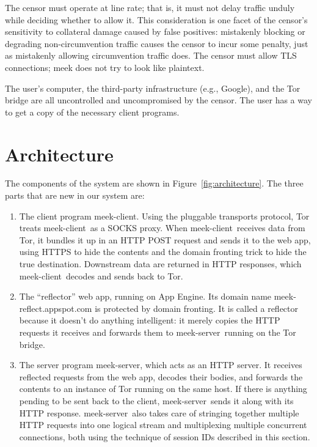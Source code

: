 \documentclass[conference]{IEEEtran}
\def\meekclient{\mbox{meek-client}}
\def\meekserver{\mbox{meek-server}}
\begin{document}
The censor must operate at line rate; that is,
it must not delay traffic unduly while deciding whether to allow it.
This consideration is one facet of the censor's sensitivity to
collateral damage caused by false positives:
mistakenly blocking or degrading non-circumvention traffic causes the censor
to incur some penalty, just as mistakenly allowing circumvention traffic does.
The censor must allow TLS connections; meek does not try to look like plaintext.

The user's computer, the third-party infrastructure (e.g., Google), and the Tor bridge
are all uncontrolled and uncompromised by the censor.
The user has a way to get a copy of the necessary client programs.

\section{Architecture}

The components of the system are shown in Figure~\ref{fig:architecture}.
The three parts that are new in our system are:
\begin{enumerate}
\item The client program \meekclient.
Using the pluggable transports protocol, Tor treats \meekclient\ as a SOCKS proxy.
When \meekclient\ receives data from Tor, it bundles it up in an HTTP POST
request and sends it to the web app,
using HTTPS to hide the contents and the domain fronting trick to hide the true destination.
Downstream data are returned in HTTP responses, which \meekclient\ decodes and sends back to Tor.
\item The ``reflector'' web app, running on App Engine.
Its domain name \mbox{meek-reflect.appspot.com} is protected by domain fronting.
It is called a reflector because it doesn't do anything intelligent:
it merely copies the HTTP requests it receives and forwards them
to \meekserver\ running on the Tor bridge.
\item The server program \meekserver, which acts as an HTTP server.
It receives reflected requests from the web app, decodes their bodies,
and forwards the contents to an instance of Tor running on the same host.
If there is anything pending to be sent back to the client,
\meekserver\ sends it along with its HTTP response.
\meekserver\ also takes care of stringing together multiple HTTP requests
into one logical stream and multiplexing multiple concurrent connections,
both using the technique of session IDs described in this section.
\end{enumerate}
\end{document}

